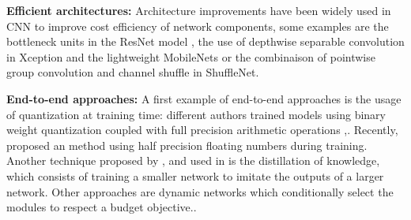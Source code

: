 \documentclass[10pt,twocolumn,letterpaper]{article}
\begin{document}
 \textbf{Efficient architectures: }Architecture improvements have been widely used in CNN to improve cost efficiency of network components, some examples are the bottleneck units in the ResNet model \cite{DBLP:journals/corr/HeZRS15}, the use of depthwise separable convolution in Xception \cite{DBLP:journals/corr/Chollet16a} and the lightweight  MobileNets\cite{DBLP:journals/corr/HowardZCKWWAA17} or the combinaison of pointwise group convolution and channel shuffle in ShuffleNet\cite{DBLP:journals/corr/ZhangZLS17}. %

\textbf{End-to-end approaches: } A first example of end-to-end approaches is the usage of quantization at training time: different authors trained models using binary weight quantization coupled with full precision arithmetic operations  \cite{DBLP:journals/corr/CourbariauxBD15},\cite{DBLP:journals/corr/Lu17c}. Recently, \cite{DBLP:journals/corr/abs-1710-03740} proposed an method using half precision floating numbers during training. Another technique proposed by \cite{DBLP:journals/corr/HintonVD15}, \cite{DBLP:journals/corr/RomeroBKCGB14} and used in \cite{2017arXiv170510924Z,2017arXiv170510194N} is the distillation of knowledge, which consists of training a smaller network to imitate the outputs of a larger network. %
Other approaches are dynamic networks which conditionally select the modules to respect a budget objective.\cite{DBLP:journals/corr/BolukbasiWDS17, DBLP:journals/corr/OdenaLO17,DBLP:journals/corr/HuangCLWMW17,DBLP:journals/corr/BengioBPP15,DBLP:journals/corr/McGillP17}. 
\end{document}
